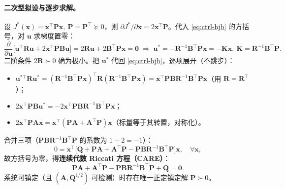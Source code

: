\paragraph{二次型拟设与逐步求解。}
设 $J^*(\mathbf{x})=\mathbf{x}^\top\mathbf{P}\mathbf{x},\ \mathbf{P}=\mathbf{P}^\top\succeq0$，则 $\partial J^*/\partial\mathbf{x}=2\mathbf{x}^\top\mathbf{P}$。代入 \cref{eq:ctrl-hjb} 的方括号，对 $\mathbf{u}$ 求梯度置零：
\begin{equation}
  \frac{\partial}{\partial\mathbf{u}}\big[\mathbf{u}^\top\mathbf{R}\mathbf{u}+2\mathbf{x}^\top\mathbf{P}\mathbf{B}\mathbf{u}\big]=2\mathbf{R}\mathbf{u}+2\mathbf{B}^\top\mathbf{P}\mathbf{x}=\mathbf{0}
  \;\Rightarrow\;\boxed{\mathbf{u}^*=-\mathbf{R}^{-1}\mathbf{B}^\top\mathbf{P}\mathbf{x}=-\mathbf{K}\mathbf{x},\ \mathbf{K}=\mathbf{R}^{-1}\mathbf{B}^\top\mathbf{P}.}
  \label{eq:ctrl-clqr-K}
\end{equation}
二阶条件 $2\mathbf{R}\succ0$ 确为极小。把 $\mathbf{u}^*$ 代回 \cref{eq:ctrl-hjb}，逐项展开（不跳步）：
\begin{itemize}
  \item $\mathbf{u}^{*\top}\mathbf{R}\mathbf{u}^*=(\mathbf{R}^{-1}\mathbf{B}^\top\mathbf{P}\mathbf{x})^\top\mathbf{R}(\mathbf{R}^{-1}\mathbf{B}^\top\mathbf{P}\mathbf{x})=\mathbf{x}^\top\mathbf{P}\mathbf{B}\mathbf{R}^{-1}\mathbf{B}^\top\mathbf{P}\mathbf{x}$（用 $\mathbf{R}=\mathbf{R}^\top$）；
  \item $2\mathbf{x}^\top\mathbf{P}\mathbf{B}\mathbf{u}^*=-2\mathbf{x}^\top\mathbf{P}\mathbf{B}\mathbf{R}^{-1}\mathbf{B}^\top\mathbf{P}\mathbf{x}$；
  \item $2\mathbf{x}^\top\mathbf{P}\mathbf{A}\mathbf{x}=\mathbf{x}^\top(\mathbf{P}\mathbf{A}+\mathbf{A}^\top\mathbf{P})\mathbf{x}$（标量等于其转置，对称化）。
\end{itemize}
合并三项（$\mathbf{P}\mathbf{B}\mathbf{R}^{-1}\mathbf{B}^\top\mathbf{P}$ 的系数为 $1-2=-1$）：
\begin{equation}
  0=\mathbf{x}^\top\big[\mathbf{Q}+\mathbf{P}\mathbf{A}+\mathbf{A}^\top\mathbf{P}-\mathbf{P}\mathbf{B}\mathbf{R}^{-1}\mathbf{B}^\top\mathbf{P}\big]\mathbf{x},\quad\forall\mathbf{x},
\end{equation}
故方括号为零，得\textbf{连续代数 Riccati 方程（CARE）}：
\begin{equation}
  \boxed{\mathbf{P}\mathbf{A}+\mathbf{A}^\top\mathbf{P}-\mathbf{P}\mathbf{B}\mathbf{R}^{-1}\mathbf{B}^\top\mathbf{P}+\mathbf{Q}=\mathbf{0}.}
  \label{eq:ctrl-care}
\end{equation}
系统可镇定（且 $(\mathbf{A},\mathbf{Q}^{1/2})$ 可检测）时存在唯一正定镇定解 $\mathbf{P}\succ0$\cite{tedrake_underactuated}。


